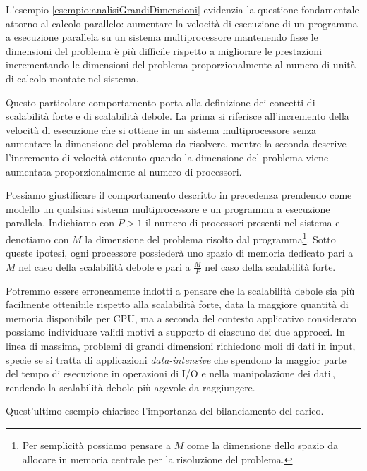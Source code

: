 L'esempio \ref{esempio:analisiGrandiDimensioni} evidenzia la questione fondamentale attorno al calcolo parallelo: aumentare la velocit\`a di esecuzione
di un programma a esecuzione parallela su un sistema multiprocessore mantenendo fisse le dimensioni del problema \`e pi\`u difficile rispetto a migliorare
le prestazioni incrementando le dimensioni del problema proporzionalmente al numero di unit\`a di calcolo montate nel sistema.

Questo particolare comportamento porta alla definizione dei concetti di scalabilit\`a forte e di scalabilit\`a debole.\newline
La prima si riferisce all'incremento della velocit\`a di esecuzione che si ottiene in un sistema multiprocessore senza aumentare la dimensione del problema da
risolvere, mentre la seconda descrive l'incremento di velocit\`a ottenuto quando la dimensione del problema viene aumentata proporzionalmente al numero
di processori.

Possiamo giustificare il comportamento descritto in precedenza prendendo come modello un qualsiasi sistema multiprocessore e un programma a esecuzione parallela.\newline
Indichiamo con $P > 1$ il numero di processori presenti nel
sistema e denotiamo con $M$ la dimensione del problema risolto dal programma\footnote{Per semplicit\`a possiamo pensare a $M$ come la dimensione dello spazio da allocare in memoria centrale per la
    risoluzione del problema.}.\newline
Sotto queste ipotesi, ogni processore possieder\`a uno spazio di memoria dedicato pari a $M$ nel caso della scalabilit\`a debole e pari a $\frac{M}{P}$ nel
caso della scalabilit\`a forte.

Potremmo essere erroneamente indotti a pensare che la scalabilit\`a debole sia pi\`u facilmente ottenibile rispetto alla scalabilit\`a forte, data la maggiore quantit\`a di memoria disponibile per CPU, ma a seconda
del contesto applicativo considerato possiamo individuare validi motivi a supporto di ciascuno dei due approcci.\newline
In linea di massima, problemi di grandi
dimensioni richiedono moli di dati in input, specie se si tratta di applicazioni \textit{data-intensive} che spendono la maggior parte del tempo di esecuzione in operazioni di I/O e nella manipolazione dei dati\,\cite{Furht2010}, rendendo la scalabilit\`a debole pi\`u agevole da raggiungere.

Quest'ultimo esempio chiarisce l'importanza del bilanciamento del carico.

